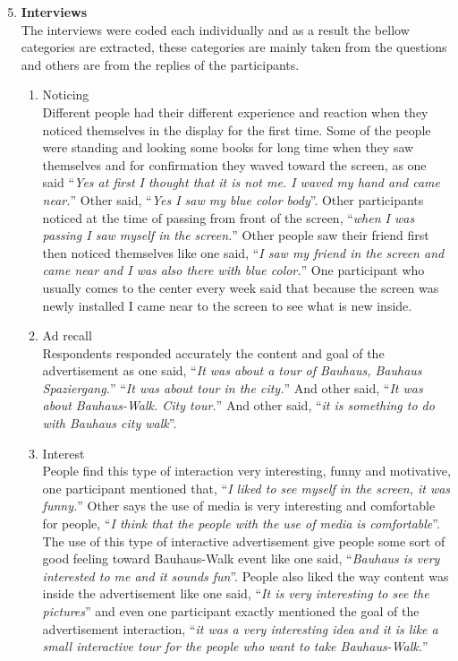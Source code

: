 \begin{enumerate}
\setcounter{enumi}{4}
\item \textbf{Interviews} \\
The interviews were coded each individually and as a result the bellow categories are extracted, these categories are mainly taken from the questions and others are from the replies of the participants. 

\begin{enumerate}

\item Noticing \\
    Different people had their different experience and reaction when they noticed themselves in the display for the first time. Some of the people were standing and looking some books for long time when they saw themselves and for confirmation they waved toward the screen, as one said ``\emph{Yes at first I thought that it is not me. I waved my hand and came near.}'' Other said, ``\emph{Yes I saw my blue color body}''. Other participants noticed at the time of passing from front of the screen, ``\emph{when I was passing I saw myself in the screen.}'' Other people saw their friend first then noticed themselves like one said, ``\emph{I saw my friend in the screen and came near and I was also there with blue color.}'' One participant who usually comes to the center every week said that because the screen was newly installed I came near to the screen to see what is new inside.

\item Ad recall \\
    Respondents responded accurately the content and goal of the advertisement as one said, ``\emph{It was about a tour of Bauhaus, Bauhaus Spaziergang.}'' ``\emph{It was about tour in the city.}'' And other said, ``\emph{It was about Bauhaus-Walk. City tour.}'' And other said, ``\emph{it is something to do with Bauhaus city walk}''.

\item Interest \\
    People find this type of interaction very interesting, funny and motivative, one participant mentioned that, ``\emph{I liked to see myself in the screen, it was funny.}'' Other says the use of media is very interesting and comfortable for people, ``\emph{I think that the people with the use of media is comfortable}''. The use of this type of interactive advertisement give people some sort of good feeling toward Bauhaus-Walk event like one said, ``\emph{Bauhaus is very interested to me and it sounds fun}''. People also liked the way content was inside the advertisement like one said, ``\emph{It is very interesting to see the pictures}'' and even one participant exactly mentioned the goal of the advertisement interaction, ``\emph{it was a very interesting idea and it is like a small interactive tour for the people who want to take Bauhaus-Walk.}''


\end{enumerate}
\end{enumerate}
